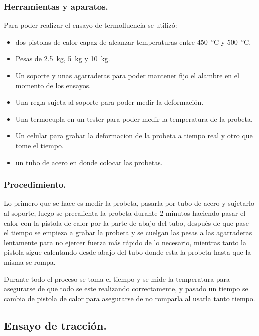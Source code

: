 \documentclass[12pt,a4paper]{article}
\begin{document}
\subsubsection{Herramientas y aparatos.}

Para poder realizar el ensayo de termofluencia se utilizó:
\begin{itemize}
    \item dos pistolas de calor capaz de alcanzar temperaturas entre \SI{450}{\celsius} y \SI{500}{\celsius}.
    \item Pesas de \SI{2,5}{\kilogram}, \SI{5}{\kilogram} y \SI{10}{\kilogram}.
    \item Un soporte y unas agarraderas para poder mantener fijo el alambre en el momento de los ensayos.
    \item Una regla sujeta al soporte para poder medir la deformación.
    \item Una termocupla en un tester para poder medir la temperatura de la probeta.
    \item Un celular para grabar la deformacion de la probeta a tiempo real y otro que tome el tiempo.
    \item un tubo de acero en donde colocar las probetas.
\end{itemize}

\subsubsection{Procedimiento.}

Lo primero que se hace es medir la probeta, pasarla por tubo de acero y sujetarlo al soporte, luego se precalienta la probeta durante 2 minutos haciendo pasar el calor con la pistola de calor por la parte de abajo del tubo, después de que pase el tiempo se empieza a grabar la probeta y se cuelgan las pesas a las agarraderas lentamente para no ejercer fuerza más rápido de lo necesario, mientras tanto la pistola sigue calentando desde abajo del tubo donde esta la probeta hasta que la misma se rompa.

Durante todo el proceso se toma el tiempo y se mide la temperatura para asegurarse de que todo se este realizando correctamente, y pasado un tiempo se cambia de pistola de calor para asegurarse de no romparla al usarla tanto tiempo.

\subsection{Ensayo de tracción.}
\end{document}
